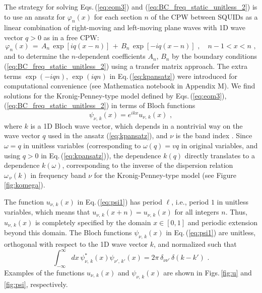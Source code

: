 The strategy for solving Eqs.\,(\ref{eq:eom3}) and (\ref{eq:BC_freq_static_unitless_2}) 
is to use an ansatz for $\varphi_n(x)$ for each section $n$ of the CPW
between SQUIDs as a linear combination of right-moving
and left-moving plane waves with 1D wave vector $q>0$ as in a free CPW:
%
\begin{equation} \label{eq:kpansatz}
\varphi_n(x) \, = \, A_n \, \exp\left[i q (x-n) \right] \, + \, 
B_n \, \exp\left[-i q (x-n) \right] \, \, , \quad n-1 < x < n \, \, ,
\end{equation}
%
and to determine the $n$-dependent coefficients $A_n$, $B_n$ by the boundary conditions 
(\ref{eq:BC_freq_static_unitless_2}) using a transfer matrix approach.
The extra terms $\exp(- i q n)$, $\exp(i q n)$ in Eq.\,(\ref{eq:kpansatz}) were introduced 
for computational convenience (see 
Mathematica notebook in Appendix M).
%
We find solutions for the Kronig-Penney-type model defined by 
Eqs.\,(\ref{eq:eom3}), (\ref{eq:BC_freq_static_unitless_2})
in terms of Bloch functions
%
\begin{equation} \label{eq:psi1}
\psi_{\nu,\,k}(x) = e^{i k x} u_{\nu,\,k}(x) \, \, ,   
\end{equation}
%
where $k$ is a 1D Bloch wave vector, which depends in a nontrivial way on the wave vector $q$ used in the ansatz (\ref{eq:kpansatz}), and $\nu$ is the band index \cite{Ashcroft1976}.
Since $\omega = q$ in unitless variables (corresponding to $\omega(q) = v q$ in original variables,
and using $q>0$ in Eq.\,(\ref{eq:kpansatz})),
the dependence $k(q)$ directly translates to a dependence $k(\omega)$, corresponding to the 
inverse of the dispersion relation $\omega_{\,\nu}(k)$ in frequency band $\nu$ for the Kronig-Penney-type model (see Figure \ref{fig:komega}).

The function  $u_{\nu,\,k}(x)$ in Eq.\,(\ref{eq:psi1}) has period $\ell$, i.e., 
period $1$ in unitless variables, which means that
$u_{\nu,\,k}(x + n) = u_{\nu,\,k}(x)$ for all integers $n$. 
Thus, $u_{\nu,\,k}(x)$ is completely specified by the domain $x \in [0,1]$ 
and periodic extension beyond this domain.
The Bloch functions $\psi_{\nu,\,k}(x)$ in Eq.\,(\ref{eq:psi1})
are unitless, orthogonal with respect to the 1D wave vector $k$, and normalized such that
%
\begin{equation} \label{eq:psi1_norm_orig}
\int_{-\infty}^{\infty} dx \, \psi^*_{\nu,\,k}(x) \psi_{\nu',\,k'}(x) = 2 \pi \, \delta_{\nu \nu'} \, \delta(k - k') \, \, .
\end{equation}
%
Examples of the functions $u_{\nu,\,k}(x)$ and $\psi_{\nu,\,k}(x)$
are shown in Figs.\,\ref{fig:u} and \ref{fig:psi}, respectively. 

